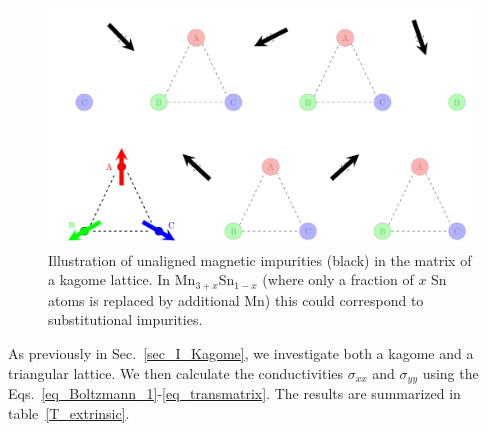 \documentclass[prb,showpacs,amsmath,amssymb,superscriptaddress,twocolumn,floatfix]{revtex4-1}
\begin{document}
\begin{figure}
	\centering
	\includegraphics[width=\linewidth]{img/Kagome_impurity}
	\caption{Illustration of unaligned magnetic impurities (black) in the matrix of a kagome lattice. In Mn$_{3+x}$Sn$_{1-x}$ (where only a fraction of $x$ Sn atoms is replaced by additional Mn) this could correspond to substitutional impurities.}
	\label{fig:kagome21}
\end{figure}


As previously in Sec.~\ref{sec_I_Kagome}, we investigate both a kagome and a triangular lattice. We then calculate the conductivities $\sigma_{xx}$ and $\sigma_{yy}$ using the Eqs.~\ref{eq_Boltzmann_1}-\ref{eq_transmatrix}. The results are summarized in table~\ref{T_extrinsic}.\\
\end{document}
